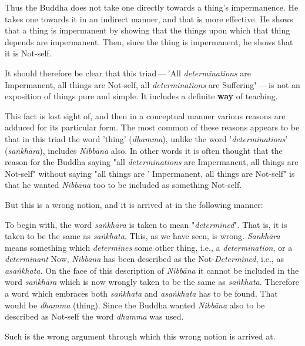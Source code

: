 Thus the Buddha does not take one directly towards a thing’s
impermanence. He takes one towards it in an indirect manner, and that is
more effective. He shows that a thing is impermanent by showing that the
things upon which that thing depends are impermanent. Then, since the
thing is impermanent, he shows that it is Not-self.


It should therefore be clear that this triad — 'All \emph{determinations} are
Impermanent, all things are Not-self, all \emph{determinations} are
Suffering" — is not an exposition of things pure and simple. It includes
a definite \textbf{way} of teaching.


This fact is lost sight of, and then in a conceptual manner various
reasons are adduced for its particular form. The most common of these
reasons appears to be that in this triad the word 'thing' (\emph{dhamma}),
unlike the word '\emph{determinations}' (\emph{saṅkhāra}), includes \emph{Nibbāna}
also. In other words it is often thought that the reason for the Buddha
saying "all \emph{determinations} are Impermanent, all things are Not-self"
without saying "all things are ' Impermanent, all things are Not-self"
is that he wanted \emph{Nibbāna} too to be included as something Not-self.


But this is a wrong notion, and it is arrived at in the following
manner:


To begin with, the word \emph{saṅkhāra} is taken to mean "\emph{determined}".
That is, it is taken to be the same as \emph{saṅkhata}. This, as we have
seen, is wrong. \emph{Sankhāra} means something which \emph{determines} some other
thing, i.e., a \emph{determination}, or a \emph{determinant} Now, \emph{Nibbāna} has
been described as the Not-\emph{Determined}, i.e., as \emph{asaṅkhata}. On the
face of this description of \emph{Nibbāna} it cannot be included in the word
\emph{saṅkhāra} which is now wrongly taken to be the same as \emph{saṅkhata}.
Therefore a word which embraces both \emph{saṅkhata} and \emph{asaṅkhata} has to
be found. That would be \emph{dhamma} (thing). Since the Buddha wanted
\emph{Nibbāna} also to be described as Not-self the word \emph{dhamma} was used.


Such is the wrong argument through which this wrong notion is arrived
at.


